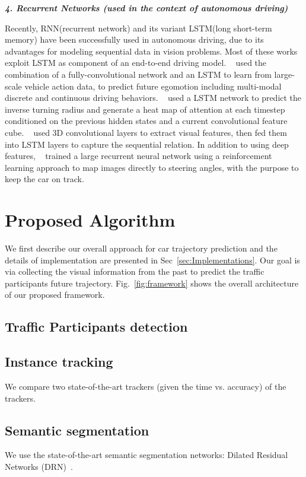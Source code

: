 \documentclass[10pt,twocolumn,letterpaper]{article}
\begin{document}
\textbf{\emph{4. Recurrent Networks (used in the context of autonomous driving)}}


Recently, RNN(recurrent network) and its variant LSTM(long short-term memory) have been successfully used in autonomous driving, due to its advantages for modeling sequential data in vision problems. Most of these works exploit LSTM as component of an end-to-end driving model. ~\cite{xu2017end} used the combination of a fully-convolutional network and an LSTM to learn from large-scale vehicle action data, to predict future egomotion including multi-modal discrete and continuous driving behaviors. ~\cite{kim2017interpretable} used a LSTM network to predict the inverse turning radius and generate a heat map of attention at each timestep conditioned on the previous hidden states and a current convolutional feature cube. ~\cite{duself} used 3D convolutional layers to extract visual features, then fed them into LSTM layers to capture the sequential relation. In addition to using deep features, ~\cite{koutnik2013evolving} trained a large recurrent neural network using a reinforcement learning approach to map images directly to steering angles, with the purpose to keep the car on track.


\section{Proposed Algorithm}

We first describe our overall approach for car trajectory prediction and the details of implementation are presented in Sec~\ref{sec:Implementations}.
Our goal is via collecting the visual information from the past to predict the traffic participants future trajectory. Fig.~\ref{fig:framework} shows the overall architecture of our proposed framework.

\subsection{Traffic Participants detection}


\subsection{Instance tracking}

We compare two state-of-the-art trackers (given the time vs. accuracy) of the trackers.

\subsection{Semantic segmentation}
We use the state-of-the-art semantic segmentation networks: Dilated Residual Networks (DRN)~\cite{yu2017dilated}.
\end{document}
